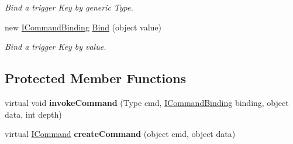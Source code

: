 \begin{DoxyCompactItemize}
\begin{DoxyCompactList}\small\item\em Bind a trigger Key by generic Type. \end{DoxyCompactList}\item 
\hypertarget{classstrange_1_1extensions_1_1command_1_1impl_1_1_command_binder_ac0dc4852ac626f07b1ce2ca2e2ffbe75}{new \hyperlink{interfacestrange_1_1extensions_1_1command_1_1api_1_1_i_command_binding}{I\-Command\-Binding} \hyperlink{classstrange_1_1extensions_1_1command_1_1impl_1_1_command_binder_ac0dc4852ac626f07b1ce2ca2e2ffbe75}{Bind} (object value)}\label{classstrange_1_1extensions_1_1command_1_1impl_1_1_command_binder_ac0dc4852ac626f07b1ce2ca2e2ffbe75}

\begin{DoxyCompactList}\small\item\em Bind a trigger Key by value. \end{DoxyCompactList}\end{DoxyCompactItemize}
\subsection*{Protected Member Functions}
\begin{DoxyCompactItemize}
\item 
\hypertarget{classstrange_1_1extensions_1_1command_1_1impl_1_1_command_binder_a8ad642c44ee3081703c815a46b38489d}{virtual void {\bfseries invoke\-Command} (Type cmd, \hyperlink{interfacestrange_1_1extensions_1_1command_1_1api_1_1_i_command_binding}{I\-Command\-Binding} binding, object data, int depth)}\label{classstrange_1_1extensions_1_1command_1_1impl_1_1_command_binder_a8ad642c44ee3081703c815a46b38489d}

\item 
\hypertarget{classstrange_1_1extensions_1_1command_1_1impl_1_1_command_binder_afcde1b363255b70ed9f84c7f90d139d4}{virtual \hyperlink{interfacestrange_1_1extensions_1_1command_1_1api_1_1_i_command}{I\-Command} {\bfseries create\-Command} (object cmd, object data)}\label{classstrange_1_1extensions_1_1command_1_1impl_1_1_command_binder_afcde1b363255b70ed9f84c7f90d139d4}

\end{DoxyCompactItemize}
